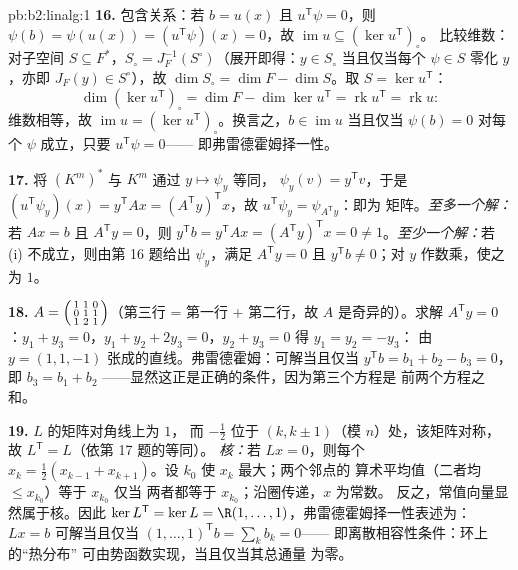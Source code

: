 \begin{solution}{pb:b2:linalg:1}
\textbf{16.} 包含关系：若 $b = u(x)$ 且 $u^{\mathsf T}\psi =
0$，则 $\psi(b) = \psi(u(x)) = (u^{\mathsf T}\psi)(x) = 0$，故
$\operatorname{im} u \subseteq (\ker u^{\mathsf T})_\circ$。
比较维数：对子空间 $S \subseteq F^*$，$S_\circ =
J_F^{-1}(S^\circ)$（展开即得：$y \in S_\circ$ 当且仅当每个 $\psi \in
S$ 零化 $y$，亦即 $J_F(y) \in S^\circ$），故 $\dim S_\circ = \dim
F - \dim S$。取 $S = \ker u^{\mathsf T}$：
\[
\dim(\ker u^{\mathsf T})_\circ
= \dim F - \dim\ker u^{\mathsf T}
= \operatorname{rk} u^{\mathsf T} = \operatorname{rk} u :
\]
维数相等，故 $\operatorname{im} u = (\ker
u^{\mathsf T})_\circ$。换言之，$b \in \operatorname{im} u$ 当且仅当
$\psi(b) = 0$ 对每个 $\psi$ 成立，只要 $u^{\mathsf T}\psi = 0$——
即弗雷德霍姆择一性。

\textbf{17.} 将 $(K^m)^*$ 与 $K^m$ 通过 $y \mapsto \psi_y$ 等同，
$\psi_y(v) = y^{\mathsf T}v$，于是 $(u^{\mathsf T}\psi_y)(x) =
y^{\mathsf T}Ax = (A^{\mathsf T}y)^{\mathsf T}x$，故 $u^{\mathsf
T}\psi_y = \psi_{A^{\mathsf T}y}$：即为
矩阵。\emph{至多一个解：}若 $Ax = b$ 且
$A^{\mathsf T}y = 0$，则 $y^{\mathsf T}b = y^{\mathsf T}Ax =
(A^{\mathsf T}y)^{\mathsf T}x = 0 \neq 1$。\emph{至少一个解：}若
(i) 不成立，则由第 16 题给出 $\psi_y$，满足 $A^{\mathsf T}y
= 0$ 且 $y^{\mathsf T}b \neq 0$；对 $y$ 作数乘，使之为 $1$。

\textbf{18.} $A = \begin{psmallmatrix} 1 & 1 & 0\\ 0 & 1 & 1\\
1 & 2 & 1\end{psmallmatrix}$（第三行 = 第一行 + 第二行，故 $A$
是奇异的）。求解 $A^{\mathsf T}y = 0$：$y_1 + y_3 = 0$，$y_1
+ y_2 + 2y_3 = 0$，$y_2 + y_3 = 0$ 得 $y_1 = y_2 = -y_3$：
由 $y = (1, 1, -1)$ 张成的直线。弗雷德霍姆：可解当且仅当
$y^{\mathsf T}b = b_1 + b_2 - b_3 = 0$，即 $b_3 = b_1 + b_2$
——显然这正是正确的条件，因为第三个方程是
前两个方程之和。

\textbf{19.} $L$ 的矩阵对角线上为 $1$，
而 $-\frac12$ 位于 $(k, k\pm1)$（模 $n$）处，该矩阵对称，故
$L^{\mathsf T} = L$（依第 17 题的等同）。
\emph{核：}若 $Lx = 0$，则每个 $x_k = \frac12(x_{k-1} +
x_{k+1})$。设 $k_0$ 使 $x_k$ 最大；两个邻点的
算术平均值（二者均 $\leq x_{k_0}$）等于 $x_{k_0}$ 仅当
两者都等于 $x_{k_0}$；沿圈传递，$x$ 为常数。
反之，常值向量显然属于核。因此 $\ker L^{\mathsf T} = \ker L
= \R(1, \dots, 1)$，弗雷德霍姆择一性表述为：$Lx = b$
可解当且仅当 $(1,\dots,1)^{\mathsf T} b = \sum_k b_k = 0$——
即离散相容性条件：环上的“热分布”
可由势函数实现，当且仅当其总通量
为零。


\end{solution}
